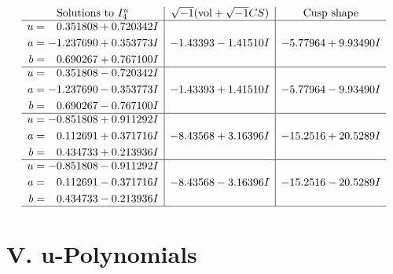 \documentclass[1p]{elsarticle_modified}
\theoremstyle{definition}
\newcommand{\I}{\sqrt{-1}}
\begin{document}
$$\begin{array}{c|c|c}  
\text{Solutions to }I^u_{4}& \I (\text{vol} + \sqrt{-1}CS) & \text{Cusp shape}\\
 \hline 
\begin{aligned}
u &= \phantom{-}0.351808 + 0.720342 I \\
a &= -1.237690 + 0.353773 I \\
b &= \phantom{-}0.690267 + 0.767100 I\end{aligned}
 & -1.43393 - 1.41510 I & -5.77964 + 9.93490 I \\ \hline\begin{aligned}
u &= \phantom{-}0.351808 - 0.720342 I \\
a &= -1.237690 - 0.353773 I \\
b &= \phantom{-}0.690267 - 0.767100 I\end{aligned}
 & -1.43393 + 1.41510 I & -5.77964 - 9.93490 I \\ \hline\begin{aligned}
u &= -0.851808 + 0.911292 I \\
a &= \phantom{-}0.112691 + 0.371716 I \\
b &= \phantom{-}0.434733 + 0.213936 I\end{aligned}
 & -8.43568 + 3.16396 I & -15.2516 + 20.5289 I \\ \hline\begin{aligned}
u &= -0.851808 - 0.911292 I \\
a &= \phantom{-}0.112691 - 0.371716 I \\
b &= \phantom{-}0.434733 - 0.213936 I\end{aligned}
 & -8.43568 - 3.16396 I & -15.2516 - 20.5289 I\\
 \hline 
 \end{array}$$\newpage
\newpage\renewcommand{\arraystretch}{1}
\centering \section*{ V. u-Polynomials}
\end{document}
